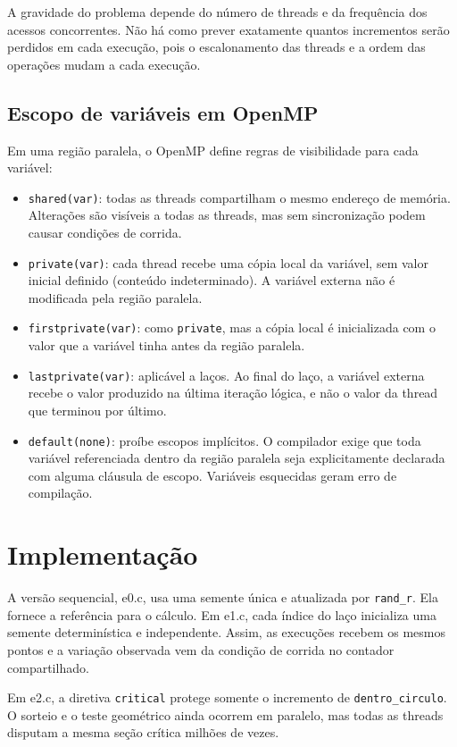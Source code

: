 \documentclass[11pt,letterpaper]{article}
\begin{document}
A gravidade do problema depende do número de threads e da frequência dos acessos concorrentes. Não há como prever exatamente quantos incrementos serão perdidos em cada execução, pois o escalonamento das threads e a ordem das operações mudam a cada execução.

\subsection{Escopo de variáveis em OpenMP}
Em uma região paralela, o OpenMP define regras de visibilidade para cada variável:

\begin{itemize}
    \item \texttt{shared(var)}: todas as threads compartilham o mesmo endereço de memória. Alterações são visíveis a todas as threads, mas sem sincronização podem causar condições de corrida.
    \item \texttt{private(var)}: cada thread recebe uma cópia local da variável, sem valor inicial definido (conteúdo indeterminado). A variável externa não é modificada pela região paralela.
    \item \texttt{firstprivate(var)}: como \texttt{private}, mas a cópia local é inicializada com o valor que a variável tinha antes da região paralela.
    \item \texttt{lastprivate(var)}: aplicável a laços. Ao final do laço, a variável externa recebe o valor produzido na última iteração lógica, e não o valor da thread que terminou por último.
    \item \texttt{default(none)}: proíbe escopos implícitos. O compilador exige que toda variável referenciada dentro da região paralela seja explicitamente declarada com alguma cláusula de escopo. Variáveis esquecidas geram erro de compilação.
\end{itemize}

\section{Implementação}

A versão sequencial, e0.c, usa uma semente única e atualizada por \texttt{rand\_r}. Ela fornece a referência para o cálculo. Em e1.c, cada índice do laço inicializa uma semente determinística e independente. Assim, as execuções recebem os mesmos pontos e a variação observada vem da condição de corrida no contador compartilhado.

Em e2.c, a diretiva \texttt{critical} protege somente o incremento de \texttt{dentro\_circulo}. O sorteio e o teste geométrico ainda ocorrem em paralelo, mas todas as threads disputam a mesma seção crítica milhões de vezes.
\end{document}
